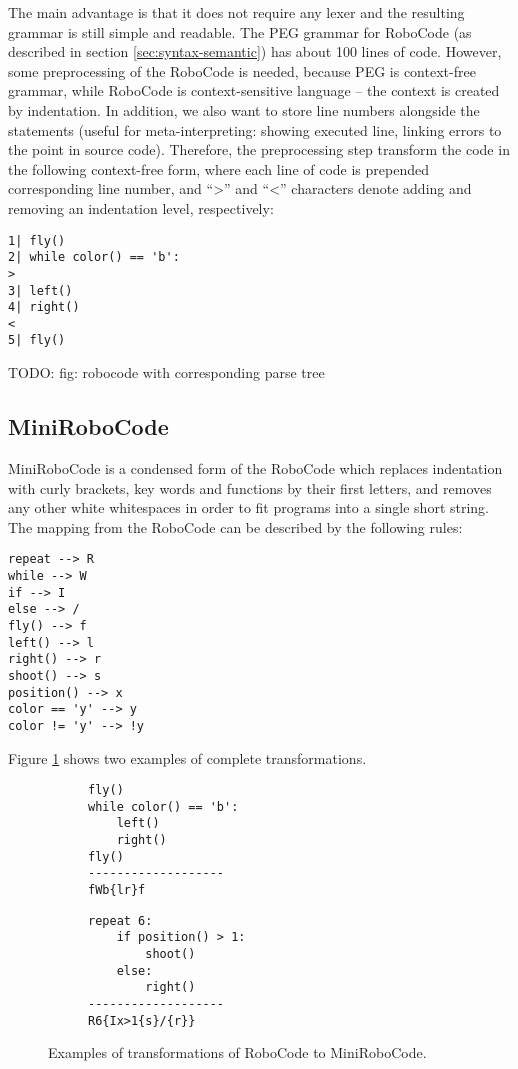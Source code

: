 The main advantage is that it does not require any lexer and the resulting grammar
is still simple and readable.
The PEG grammar for RoboCode (as described in section \ref{sec:syntax-semantic})
has about 100 lines of code.
However, some preprocessing of the RoboCode is needed, because
PEG is context-free grammar,
while RoboCode is context-sensitive language
-- the context is created by indentation.
In addition, we also want to store line numbers alongside the statements
(useful for meta-interpreting:
showing executed line,
linking errors to the point in source code).
Therefore, the preprocessing step transform the code in the following context-free form,
where each line of code is prepended corresponding line number,
and ``>'' and ``<'' characters denote adding and removing an indentation level, respectively:

\begin{lstlisting}
1| fly()
2| while color() == 'b':
>
3| left()
4| right()
<
5| fly()
\end{lstlisting}

TODO: fig: robocode with corresponding parse tree

\subsection{MiniRoboCode}

MiniRoboCode is a condensed form of the RoboCode
which replaces indentation with curly brackets,
key words and functions by their first letters,
and removes any other white whitespaces
in order to fit programs into a single short string.
The mapping from the RoboCode can be described by the following rules:
\begin{lstlisting}
repeat --> R
while --> W
if --> I
else --> /
fly() --> f
left() --> l
right() --> r
shoot() --> s
position() --> x
color == 'y' --> y
color != 'y' --> !y
\end{lstlisting}

Figure \ref{fig:minirobocode-transformations} shows
two examples of complete transformations.
\begin{figure}[h]
\begin{center}
\begin{subfigure}{.49\textwidth}
{\lstset{numbers=none}
\begin{lstlisting}
fly()
while color() == 'b':
    left()
    right()
fly()
-------------------
fWb{lr}f
\end{lstlisting}}
\end{subfigure}
\begin{subfigure}{.49\textwidth}
{\lstset{numbers=none}
\begin{lstlisting}
repeat 6:
    if position() > 1:
        shoot()
    else:
        right()
-------------------
R6{Ix>1{s}/{r}}
\end{lstlisting}}
\end{subfigure}
\end{center}
\caption{Examples of transformations of RoboCode to MiniRoboCode.}
\label{fig:minirobocode-transformations}
\end{figure}

